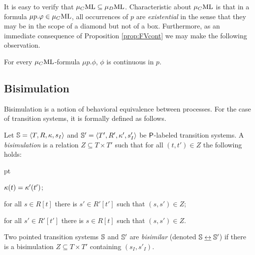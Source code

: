 
It is easy to verify that $\mu_{C}\mathrm{ML} \subseteq \mu_{D}\mathrm{ML}$.
Characteristic about $\mu_{C}\mathrm{ML}$ is that in a formula $\mu p. \varphi \in \mu_{C}\mathrm{ML}$,
all occurrences of $p$ are \emph{existential} in the sense that they may be 
in the scope of a diamond but not of a box.
Furthermore, as an immediate consequence of Proposition \ref{prop:FVcont} we 
may make the following observation.

\begin{corollary}\label{cor:cont}
For every $\mu_{C}\mathrm{ML}$-formula $\mu p. \phi$, $\phi$ is continuous in $p$.
\end{corollary}

\subsection{Bisimulation}
% 

Bisimulation is a notion of behavioral equivalence between processes.
For the case of  transition systems, it is formally defined as follows.

\begin{definition}
Let $\mathbb{S} = \langle{T, R, \kappa, s_I}\rangle$ and $\mathbb{S}' = \langle{T', R', \kappa', 
s'_I}\rangle$ be $\mathsf{P}$-labeled transition systems.
A \emph{bisimulation} is a relation $Z \subseteq T \times T'$ such that for all 
$(t,t') \in Z$ the following holds:
\begin{description}
   pt
  \item[(atom)] 
  $\kappa(t) = \kappa'(t')$;
  \item[(forth)] 
  for all $s \in R[t]$ there is $s'\in R'[t']$ such
  that $(s,s') \in Z$;
  \item[(back)] 
  for all $s'\in R'[t']$ there is $s \in R[t]$ such
  that $(s,s') \in Z$.
\end{description}
%
Two pointed transition systems $\mathbb{S}$ and $\mathbb{S}'$ are
\emph{bisimilar} (denoted $\mathbb{S} \mathrel{\underline{\leftrightarrow}} \mathbb{S}'$) if there is a
bisimulation $Z \subseteq T \times T'$ containing $(s_I,s'_I)$.
\end{definition}


